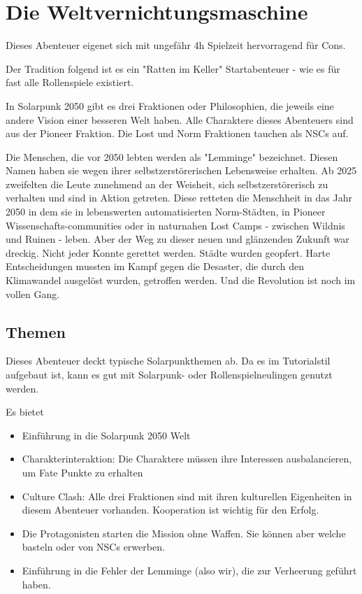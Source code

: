 \chapter{Die Weltvernichtungsmaschine}
\label{ch:the world destroying machine}

Dieses Abenteuer eigenet sich mit ungefähr 4h Spielzeit hervorragend für Cons.

Der Tradition folgend ist es ein "Ratten im Keller" Startabenteuer - wie es für fast alle Rollenspiele existiert.

In Solarpunk 2050 gibt es drei Fraktionen oder Philosophien, die jeweils eine andere Vision einer besseren Welt haben.
Alle Charaktere dieses Abenteuers sind aus der Pioneer Fraktion. Die Lost und Norm Fraktionen tauchen als NSCs auf.

\begin{sidebarBox}[title=Der dreckige Weg nach Eden]

Die Menschen, die vor 2050 lebten werden als "Lemminge" bezeichnet. Diesen Namen haben sie wegen ihrer selbstzerstörerischen Lebensweise erhalten. Ab 2025 zweifelten die Leute zunehmend an der Weisheit, sich selbstzerstörerisch zu verhalten und sind in Aktion getreten. Diese retteten die Menschheit in das Jahr 2050 in dem sie in lebenswerten automatisierten Norm-Städten, in Pioneer Wissenschafts-communities oder in naturnahen Lost Camps - zwischen Wildnis und Ruinen - leben.
Aber der Weg zu dieser neuen und glänzenden Zukunft war dreckig. Nicht jeder Konnte gerettet werden. Städte wurden geopfert. Harte Entscheidungen mussten im Kampf gegen die Desaster, die durch den Klimawandel ausgelöst wurden, getroffen werden.
Und die Revolution ist noch im vollen Gang.

\end{sidebarBox}

\section{Themen}

Dieses Abenteuer deckt typische Solarpunkthemen ab. Da es im Tutorialstil aufgebaut ist, kann es gut mit Solarpunk- oder Rollenspielneulingen genutzt werden.

Es bietet

\begin{itemize}
\item Einführung in die Solarpunk 2050 Welt
\item Charakterinteraktion: Die Charaktere müssen ihre Interessen ausbalancieren, um Fate Punkte zu erhalten
\item Culture Clash: Alle drei Fraktionen sind mit ihren kulturellen Eigenheiten in diesem Abenteuer vorhanden. Kooperation ist wichtig für den Erfolg.
\item Die Protagonisten starten die Mission ohne Waffen. Sie können aber welche basteln oder von NSCs erwerben.
\item Einführung in die Fehler der Lemminge (also wir), die zur Verheerung geführt haben.
\end{itemize}

